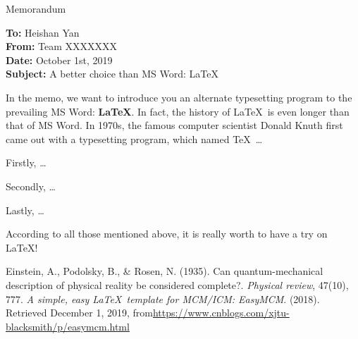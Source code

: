 \documentclass[12pt]{article}  %
\begin{document}
\begin{letter}{Memorandum}
\begin{flushleft}  %
\textbf{To:} Heishan Yan\\
\textbf{From:} Team XXXXXXX\\
\textbf{Date:} October 1st, 2019\\
\textbf{Subject:} A better choice than MS Word: \LaTeX
\end{flushleft}

In the memo, we want to introduce you an alternate typesetting program to the prevailing MS Word: \textbf{\LaTeX}. In fact, the history of \LaTeX\ is even longer than that of MS Word. In 1970s, the famous computer scientist Donald Knuth first came out with a typesetting program, which named \TeX\ \ldots

Firstly, \ldots

Secondly, \ldots

Lastly, \ldots

According to all those mentioned above, it is really worth to have a try on \LaTeX! 
\end{letter}


\begin{thebibliography}{99}
 Einstein, A., Podolsky, B., \& Rosen, N. (1935). Can quantum-mechanical description of physical reality be considered complete?. \emph{Physical review}, 47(10), 777.
 \emph{A simple, easy \LaTeX\ template for MCM/ICM: EasyMCM}. (2018). Retrieved December 1, 2019, from\url{https://www.cnblogs.com/xjtu-blacksmith/p/easymcm.html}
\end{thebibliography}


\end{document}
